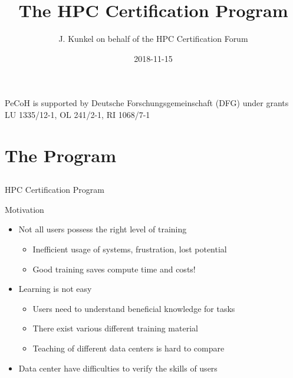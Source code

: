 \documentclass[compress,aspectratio=169]{beamer}
\subtitle{}
\title{\huge The HPC Certification Program}
\author{J. Kunkel on behalf of the HPC Certification Forum}
\date{2018-11-15}
\institute{Computer Science Department}
\begin{document}
\begin{frame}[plain]{}
	\maketitle
	{\fontsize{5.85pt}{6pt}\selectfont PeCoH is supported by Deutsche Forschungsgemeinschaft (DFG) under grants LU 1335/12-1, OL 241/2-1, RI 1068/7-1}
\end{frame}






\section{The Program}
\sectionIntroHidden

\subsection{}

\begin{frame}{HPC Certification Program}
	\begin{block}{Motivation}
		\begin{itemize}

			\item Not all users possess the right level of training
				\begin{itemize}
				\item Inefficient usage of systems, frustration, lost potential
				\item Good training saves compute time and costs!
				\end{itemize}
			\item Learning is not easy
			\begin{itemize}
				\item Users need to understand beneficial knowledge for tasks
				\item There exist various different training material
				\item Teaching of different data centers is hard to compare
			\end{itemize}
			\item Data center have difficulties to verify the skills of users
		\end{itemize}
	\end{block}

\end{frame}
\end{document}
